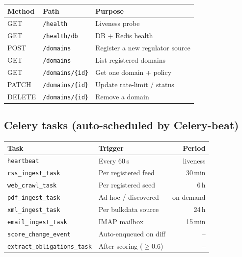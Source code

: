 \documentclass[11pt,a4paper]{article}
\begin{document}
\begin{center}
\small
\begin{tabular}{lll}
\toprule
\textbf{Method} & \textbf{Path}               & \textbf{Purpose} \\
\midrule
GET    & \texttt{/health}           & Liveness probe \\
GET    & \texttt{/health/db}        & DB + Redis health \\
POST   & \texttt{/domains}          & Register a new regulator source \\
GET    & \texttt{/domains}          & List registered domains \\
GET    & \texttt{/domains/\{id\}}   & Get one domain + policy \\
PATCH  & \texttt{/domains/\{id\}}   & Update rate-limit / status \\
DELETE & \texttt{/domains/\{id\}}   & Remove a domain \\
\bottomrule
\end{tabular}
\end{center}

\subsection{Celery tasks (auto-scheduled by Celery-beat)}

\begin{center}
\small
\begin{tabular}{llr}
\toprule
\textbf{Task}                   & \textbf{Trigger}         & \textbf{Period} \\
\midrule
\texttt{heartbeat}              & Every 60\,s          & liveness   \\
\texttt{rss\_ingest\_task}      & Per registered feed  & 30\,min    \\
\texttt{web\_crawl\_task}       & Per registered seed  & 6\,h       \\
\texttt{pdf\_ingest\_task}      & Ad-hoc / discovered  & on demand  \\
\texttt{xml\_ingest\_task}      & Per bulkdata source  & 24\,h      \\
\texttt{email\_ingest\_task}    & IMAP mailbox         & 15\,min    \\
\texttt{score\_change\_event}   & Auto-enqueued on diff& --         \\
\texttt{extract\_obligations\_task} & After scoring ($\geq 0.6$) & -- \\
\bottomrule
\end{tabular}
\end{center}
\end{document}
